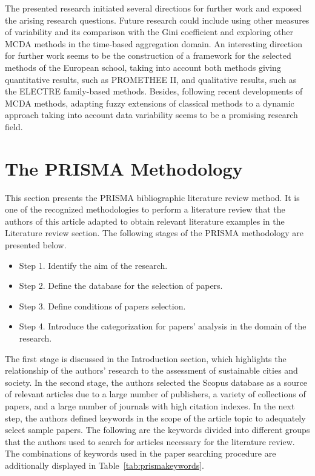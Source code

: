 \documentclass[5p,times]{elsarticle}
\newcounter{example}[section]
\begin{document}
The presented research initiated several directions for further work and exposed the arising research questions. Future research could include using other measures of variability and its comparison with the Gini coefficient and exploring other MCDA methods in the time-based aggregation domain. An interesting direction for further work seems to be the construction of a framework for the selected methods of the European school, taking into account both methods giving quantitative results, such as PROMETHEE II, and qualitative results, such as the ELECTRE family-based methods. Besides, following recent developments of MCDA methods, adapting fuzzy extensions of classical methods to a dynamic approach taking into account data variability seems to be a promising research field. 

\appendix
\label{sec:app}
\section{The PRISMA Methodology}
\label{sec:appPRISMA}
This section presents the PRISMA bibliographic literature review method. It is one of the recognized methodologies to perform a literature review that the authors of this article adapted to obtain relevant literature examples in the Literature review section. The following stages of the PRISMA methodology are presented below.

\begin{itemize}
    \item {Step 1. Identify the aim of the research.}
    \item {Step 2. Define the database for the selection of papers.}
    \item {Step 3. Define conditions of papers selection.}
    \item {Step 4. Introduce the categorization for papers' analysis in the domain of the research.}
\end{itemize}

The first stage is discussed in the Introduction section, which highlights the relationship of the authors' research to the assessment of sustainable cities and society. In the second stage, the authors selected the Scopus database as a source of relevant articles due to a large number of publishers, a variety of collections of papers, and a large number of journals with high citation indexes. In the next step, the authors defined keywords in the scope of the article topic to adequately select sample papers. The following are the keywords divided into different groups that the authors used to search for articles necessary for the literature review. The combinations of keywords used in the paper searching procedure are additionally displayed in Table~\ref{tab:prismakeywords}.
\end{document}

